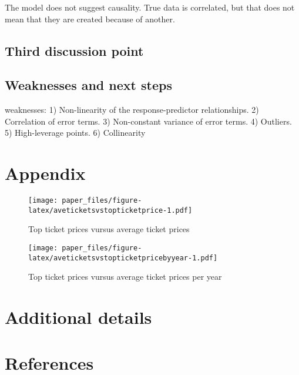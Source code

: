 \documentclass[
]{article}
\begin{document}
The model does not suggest causality. True data is correlated, but that does not mean that they are created because of another.

\hypertarget{third-discussion-point}{%
\subsection{Third discussion point}\label{third-discussion-point}}

\hypertarget{weaknesses-and-next-steps}{%
\subsection{Weaknesses and next steps}\label{weaknesses-and-next-steps}}

weaknesses:
1) Non-linearity of the response-predictor relationships.
2) Correlation of error terms.
3) Non-constant variance of error terms.
4) Outliers.
5) High-leverage points.
6) Collinearity

\newpage

\appendix

\hypertarget{appendix}{%
\section*{Appendix}\label{appendix}}

\begin{figure}
\centering
\texttt{[image: paper\_files/figure-latex/aveticketsvstopticketprice-1.pdf]}
\caption{\label{fig:aveticketsvstopticketprice}Top ticket prices vursus average ticket prices}
\end{figure}

\begin{figure}
\centering
\texttt{[image: paper\_files/figure-latex/aveticketsvstopticketpricebyyear-1.pdf]}
\caption{\label{fig:aveticketsvstopticketpricebyyear}Top ticket prices vursus average ticket prices per year}
\end{figure}

\newpage

\hypertarget{additional-details}{%
\section{Additional details}\label{additional-details}}

\newpage

\hypertarget{references}{%
\section*{References}\label{references}}
\end{document}
